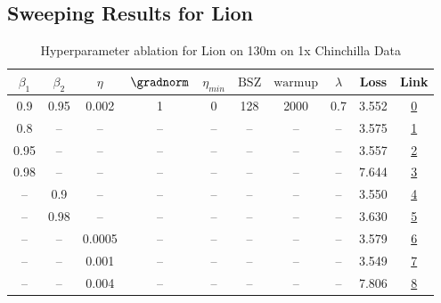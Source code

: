 \subsection{Sweeping Results for Lion}%
\begin{table}[H]
\centering
\caption{Hyperparameter ablation for Lion on 130m on 1x Chinchilla Data}
\label{tab:ablation_lion_130m_on_1x_chinchilla_data}
\begin{tabular}{cccccccccc}
\toprule
$\beta_1$ & $\beta_2$ & $\eta$ & $\gradnorm$ & $\eta_{min}$ & $\mathrm{BSZ}$ & $\mathrm{warmup}$ & $\lambda$ & Loss & Link \\
\midrule
0.9 & 0.95 & 0.002 & 1 & 0 & 128 & 2000 & 0.7 & 3.552 & \href{https://wandb.ai/stanford-mercury/optimizer-scaling/runs/sweep-130m-2B-lion3532d0lr0.002-wd0.7-minlr0-warmup2000-b10.9-b2-2f88e4}{0} \\
\midrule
0.8 & -- & -- & -- & -- & -- & -- & -- & 3.575 & \href{https://wandb.ai/stanford-mercury/optimizer-scaling/runs/sweep-130m-2B-lion8b138flr0.002-wd0.7-minlr0-warmup2000-b10.8-b2-9d739e}{1} \\
0.95 & -- & -- & -- & -- & -- & -- & -- & 3.557 & \href{https://wandb.ai/stanford-mercury/optimizer-scaling/runs/sweep-130m-2B-lion49977alr0.002-wd0.7-minlr0-warmup2000-b10.95-b-0c8700}{2} \\
0.98 & -- & -- & -- & -- & -- & -- & -- & 7.644 & \href{https://wandb.ai/stanford-mercury/optimizer-scaling/runs/sweep-130m-2B-lion584608lr0.002-wd0.7-minlr0-warmup2000-b10.98-b-bb0378}{3} \\
-- & 0.9 & -- & -- & -- & -- & -- & -- & 3.550 & \href{https://wandb.ai/stanford-mercury/optimizer-scaling/runs/sweep-130m-2B-lionf88c83lr0.002-wd0.7-minlr0-warmup2000-b10.9-b2-3f2e17}{4} \\
-- & 0.98 & -- & -- & -- & -- & -- & -- & 3.630 & \href{https://wandb.ai/stanford-mercury/optimizer-scaling/runs/sweep-130m-2B-lionfc7ef4lr0.002-wd0.7-minlr0-warmup2000-b10.9-b2-27db87}{5} \\
-- & -- & 0.0005 & -- & -- & -- & -- & -- & 3.579 & \href{https://wandb.ai/stanford-mercury/optimizer-scaling/runs/sweep-130m-2B-liony630ce4lr0.0005-wd0.7-minlr0-warmup2000-b10.9--ceaedd}{6} \\
-- & -- & 0.001 & -- & -- & -- & -- & -- & 3.549 & \href{https://wandb.ai/stanford-mercury/optimizer-scaling/runs/sweep-130m-2B-lion5039d1lr0.001-wd0.7-minlr0-warmup2000-b10.9-b2-3938db}{7} \\
-- & -- & 0.004 & -- & -- & -- & -- & -- & 7.806 & \href{https://wandb.ai/stanford-mercury/optimizer-scaling/runs/sweep-130m-2B-liona51523lr0.004-wd0.7-minlr0-warmup2000-b10.9-b2-7563ab}{8} \\

\end{tabular}
\end{table}
